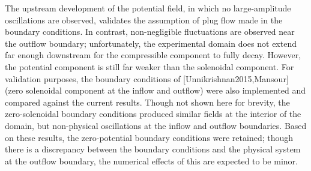 The upstream development of the potential field, in which no large-amplitude oscillations are observed, validates the assumption of plug flow made in the boundary conditions.
In contrast, non-negligible fluctuations are observed near the outflow boundary; unfortunately, the experimental domain does not extend far enough downstream for the compressible component to fully decay.
However, the potential component is still far weaker than the solenoidal component.
For validation purposes, the boundary conditions of [Unnikrishnan2015,Mansour] (zero solenoidal component at the inflow and outflow) were also implemented and compared against the current results.
Though not shown here for brevity, the zero-solenoidal boundary conditions produced similar fields at the interior of the domain, but non-physical oscillations at the inflow and outflow boundaries.
Based on these results, the zero-potential boundary conditions were retained; though there is a discrepancy between the boundary conditions and the physical system at the outflow boundary, the numerical effects of this are expected to be minor.

